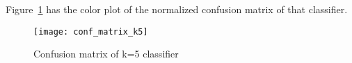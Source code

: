 Figure~\ref{fig:conf_mat_k5} has the color plot of the normalized confusion
matrix of that classifier.
\begin{figure}[h]
  \centering
  \texttt{[image: conf\_matrix\_k5]}
  \caption{Confusion matrix of k=5 classifier}
\label{fig:conf_mat_k5}
\end{figure}









